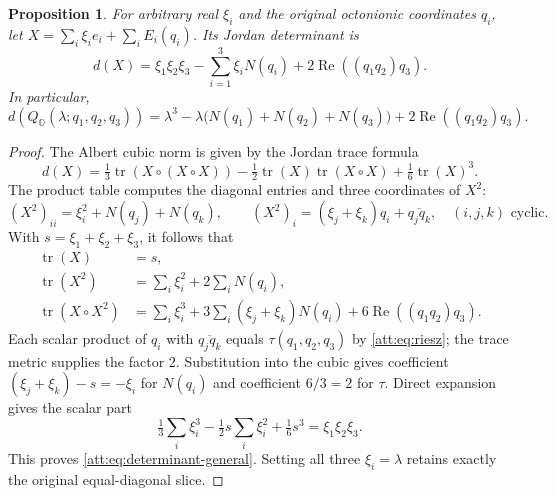 \documentclass[11pt]{article}
\newtheorem{proposition}[theorem]{Proposition}
\theoremstyle{definition}
\begin{document}
\begin{proposition}\label{att:prop:determinant}
For arbitrary real $\xi_i$ and the original octonionic coordinates
$q_i$, let $X=\sum_i\xi_i e_i+\sum_iE_i(q_i)$. Its Jordan determinant is
\begin{equation}
 d(X)=\xi_1\xi_2\xi_3-\sum_{i=1}^3\xi_iN(q_i)
                    +2\operatorname{Re}((q_1q_2)q_3).
 \label{att:eq:determinant-general}
\end{equation}
In particular,
\[
 d(Q_{\mathbb O}(\lambda;q_1,q_2,q_3))
 =\lambda^3-\lambda\bigl(N(q_1)+N(q_2)+N(q_3)\bigr)
                  +2\operatorname{Re}((q_1q_2)q_3).
\]
\end{proposition}

\begin{proof}
The Albert cubic norm is given by the Jordan trace formula
\[
 d(X)=\tfrac13\operatorname{tr}(X\circ(X\circ X))
 -\tfrac12\operatorname{tr}(X)\operatorname{tr}(X\circ X)
 +\tfrac16\operatorname{tr}(X)^3.
\]
The product table computes the diagonal entries and three coordinates
of $X^2$:
\[
 (X^2)_{ii}=\xi_i^2+N(q_j)+N(q_k),\qquad
 (X^2)_i=(\xi_j+\xi_k)q_i+\overline{q_jq_k},
 \quad(i,j,k)\text{ cyclic}.
\]
With $s=\xi_1+\xi_2+\xi_3$, it follows that
\begin{align*}
 \operatorname{tr}(X)&=s,\\
 \operatorname{tr}(X^2)&=\sum_i\xi_i^2+2\sum_iN(q_i),\\
 \operatorname{tr}(X\circ X^2)
 &=\sum_i\xi_i^3+3\sum_i(\xi_j+\xi_k)N(q_i)
                     +6\operatorname{Re}((q_1q_2)q_3).
\end{align*}
Each scalar product of $q_i$ with $\overline{q_jq_k}$ equals
$\tau(q_1,q_2,q_3)$ by \eqref{att:eq:riesz}; the trace metric supplies
the factor $2$. Substitution into the cubic gives coefficient
$(\xi_j+\xi_k)-s=-\xi_i$ for $N(q_i)$ and coefficient $6/3=2$ for
$\tau$. Direct expansion gives the scalar part
\[
 \tfrac13\sum_i\xi_i^3-\tfrac12s\sum_i\xi_i^2+\tfrac16s^3
 =\xi_1\xi_2\xi_3.
\]
This proves \eqref{att:eq:determinant-general}. Setting all three
$\xi_i=\lambda$ retains exactly the original equal-diagonal slice.
\end{proof}
\end{document}

